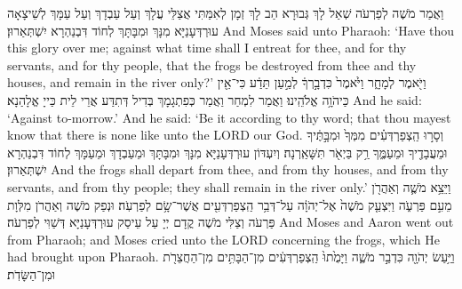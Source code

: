 {{}
{וַאֲמַר מֹשֶׁה לְפַרְעֹה שְׁאַל לָךְ גְּבוּרָא הַב לָךְ זְמָן לְאִמַּתִּי אֲצַלֵּי עֲלָךְ וְעַל עַבְדָךְ וְעַל עַמָּךְ לְשֵׁיצָאָה עוּרְדְּעָנַיָּא מִנָּךְ וּמִבָּתָּךְ לְחוֹד דִּבְנַהְרָא יִשְׁתְּאַרוּן׃}
{And Moses said unto Pharaoh: ‘Have thou this glory over me; against what time shall I entreat for thee, and for thy servants, and for thy people, that the frogs be destroyed from thee and thy houses, and remain in the river only?’}{}
{וַיֹּ֖אמֶר לְמָחָ֑ר וַיֹּ֙אמֶר֙ כִּדְבָ֣רְךָ֔ לְמַ֣עַן תֵּדַ֔ע כִּי־אֵ֖ין כַּיהֹוָ֥ה אֱלֹהֵֽינוּ׃
}
{וַאֲמַר לִמְחַר וַאֲמַר כְּפִתְגָמָךְ בְּדִיל דְּתִדַּע אֲרֵי לֵית כַּייָ אֱלָהַנָא׃}
{And he said: ‘Against to-morrow.’ And he said: ‘Be it according to thy word; that thou mayest know that there is none like unto the LORD our God.}{}
{וְסָר֣וּ הַֽצְפַרְדְּעִ֗ים מִמְּךָ֙ וּמִבָּ֣תֶּ֔יךָ וּמֵעֲבָדֶ֖יךָ וּמֵעַמֶּ֑ךָ רַ֥ק בַּיְאֹ֖ר תִּשָּׁאַֽרְנָה׃}
{וְיִעְדּוֹן עוּרְדְּעָנַיָּא מִנָּךְ וּמִבָּתָּךְ וּמֵעַבְדָךְ וּמֵעַמָּךְ לְחוֹד דִּבְנַהְרָא יִשְׁתְּאַרוּן׃}
{And the frogs shall depart from thee, and from thy houses, and from thy servants, and from thy people; they shall remain in the river only.’}{}
{וַיֵּצֵ֥א מֹשֶׁ֛ה וְאַהֲרֹ֖ן מֵעִ֣ם פַּרְעֹ֑ה וַיִּצְעַ֤ק מֹשֶׁה֙ אֶל־יְהֹוָ֔ה עַל־דְּבַ֥ר הַֽצְפַרְדְּעִ֖ים אֲשֶׁר־שָׂ֥ם לְפַרְעֹֽה׃
}
{וּנְפַק מֹשֶׁה וְאַהֲרֹן מִלְּוָת פַּרְעֹה וְצַלִּי מֹשֶׁה קֳדָם יְיָ עַל עֵיסַק עוּרְדְּעָנַיָּא דְּשַׁוִּי לְפַרְעֹה׃}
{And Moses and Aaron went out from Pharaoh; and Moses cried unto the LORD concerning the frogs, which He had brought upon Pharaoh.}{}
{וַיַּ֥עַשׂ יְהֹוָ֖ה כִּדְבַ֣ר מֹשֶׁ֑ה וַיָּמֻ֙תוּ֙ הַֽצְפַרְדְּעִ֔ים מִן־הַבָּתִּ֥ים מִן־הַחֲצֵרֹ֖ת וּמִן־הַשָּׂדֹֽת׃}
}
